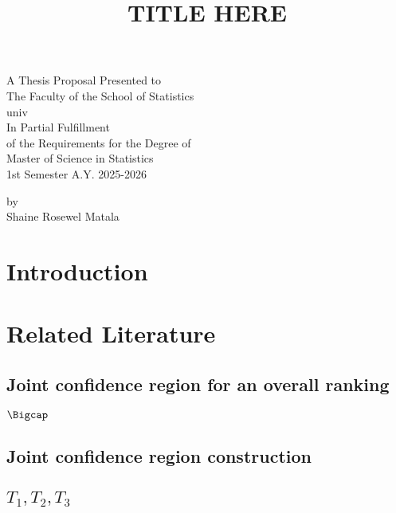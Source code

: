 \documentclass[
  12pt,
  a4paper,
]{article}
\author{}
\date{\vspace{-2.5em}}
\numberwithin{equation}{section}
\begin{document}
\title{\vspace{20mm}TITLE HERE}
\maketitle
\thispagestyle{empty} 
\vspace*{95px}
\begin{center}
A Thesis Proposal Presented to\\
The Faculty of the School of Statistics\\
univ\\
\vspace*{100px}
In Partial Fulfillment\\
of the Requirements for the Degree of\\
Master of Science in Statistics\\
1st Semester A.Y. 2025-2026

\vspace*{100px}
by\\
Shaine Rosewel Matala
\end{center}

\newpage

\newpage

\tableofcontents

\newpage

\section{Introduction}\label{introduction}

\section{Related Literature}\label{related-literature}

\subsection{Joint confidence region for an overall ranking}\label{joint-confidence-region-for-an-overall-ranking}

\(\Bigcap\)

\subsection{Joint confidence region construction}\label{joint-confidence-region-construction}

\subsection{\texorpdfstring{\(T_1, T_2, T_3\)}{T\_1, T\_2, T\_3}}\label{t_1-t_2-t_3}
\end{document}
